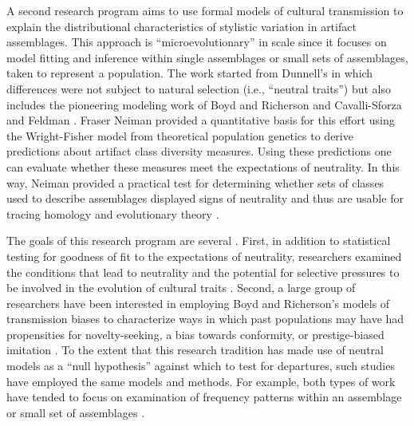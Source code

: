 A second research program aims to use formal models of cultural transmission to explain the distributional characteristics of stylistic variation in artifact assemblages.  This approach is ``microevolutionary'' in scale since it focuses on model fitting and inference within single assemblages or small sets of assemblages, taken to represent a population.  The work started from Dunnell's \citeyearpar{Dunnell1978} in which differences were not subject to natural selection (i.e., ``neutral traits'') but also includes the pioneering modeling work of Boyd and Richerson \citeyearpar{BR1985} and Cavalli-Sforza and Feldman \citeyearpar{CF1981}.  Fraser Neiman \citeyearpar{Neiman1995} provided a quantitative basis for this effort using the Wright-Fisher model from theoretical population genetics to derive predictions about artifact class diversity measures. Using these predictions one can evaluate whether these measures meet the expectations of neutrality.  In  this way, Neiman provided a practical test for determining whether sets of classes used to describe assemblages displayed signs of neutrality and thus are usable for tracing homology and evolutionary theory \citep{eerkens2006cultural,Eerkens2007,Lipo1997,Lipo2001neutrality,Lipo2006}.  

The goals of this research program are several \citep{marwick2005can}.  First, in addition to statistical testing for goodness of fit to the expectations of neutrality, researchers examined the conditions that lead to neutrality and the potential for selective pressures to be involved in the evolution of cultural traits \citep{bettinger1999point,Bettinger2008,eerkens2005cultural,Evans2011,Pfeffer2001,steele2010ceramic,Wilhelmsen2001}.   Second, a large group of researchers have been interested in employing Boyd and Richerson's \citeyearpar{BR1985} models of transmission biases to characterize ways in which past populations may have had propensities for novelty-seeking, a bias towards conformity, or prestige-biased imitation  \citep{acerbi2014biases,Bentley2001,8913,Bentley2003,bentley2004random,Bentley2007b,bettinger1999point,Herzog2004,Kohler2004,Mesoudi2009,Shennan2001ceramic,shennan2008style}.  To the extent that this research tradition has made use of neutral models as a ``null hypothesis'' against which to test for departures, such studies have employed the same models and methods.  For example, both types of work have tended to focus on examination of frequency patterns within an assemblage or small set of assemblages \citep[see the detailed reviews by][]{kandler2019analysing,walsh2019introduction}.

